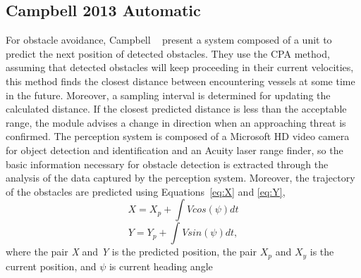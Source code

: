     
    \subsection{Campbell 2013 Automatic}
    For obstacle avoidance, Campbell \etal~\cite{Campbell2013Automatic} present a system composed of a unit to predict the next position of detected obstacles. They use the \ac{CPA} method, assuming that detected obstacles will keep proceeding in their current velocities, this method finds the closest distance between encountering vessels at some time in the future. Moreover, a sampling interval is determined for updating the calculated distance. If the closest predicted distance is less than the acceptable range, the module advises a change in direction when an approaching threat is confirmed. The perception system is composed of a Microsoft HD video camera for object detection and identification and an Acuity laser range finder, so the basic information necessary for obstacle detection is extracted through the analysis of the data captured by the perception system. Moreover, the trajectory of the obstacles are predicted using Equations~\ref{eq:X} and \ref{eq:Y},
    \begin{equation}
    \label{eq:X}
    X = X_p + \int V cos(\psi)dt
    \end{equation}
    \begin{equation}
    \label{eq:Y}
    Y = Y_p + \int V sin(\psi)dt,
    \end{equation}
    where the pair \textit{X} and \textit{Y} is the predicted position, the pair $X_p$ and $X_y$ is the current position, and $\psi$ is current heading angle
    
